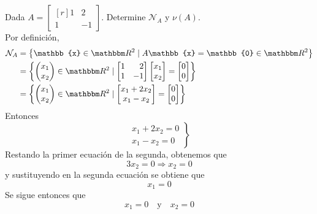 \begin{example}
    Dada $A = \begin{bmatrix*}[r]
        1 & 2 \\
        1 & -1
    \end{bmatrix*}$. Determine $\mathcal{N}_A$ y $\nu(A)$. \\
    \solucion Por definición,
    \begin{align*}
        \mathcal{N}_A & = \left\{ \mathbb{x} \in \RR[2] \mid A\mathbb{x} = \mathbb{0} \in \RR[2] \right\} \\
        & = \left\{ \begin{pmatrix}
            x_1 \\
            x_2
        \end{pmatrix} \in \RR[2] \mid \begin{bmatrix*}[r]
            1 & 2 \\
            1 & -1
        \end{bmatrix*} \begin{bmatrix}
            x_1 \\
            x_2
        \end{bmatrix} = \begin{bmatrix}
            0 \\
            0
        \end{bmatrix} \right\} \\
        & = \left\{ \begin{pmatrix}
            x_1 \\
            x_2
        \end{pmatrix} \in \RR[2] \mid \begin{bmatrix}
            x_1 + 2x_2 \\
            x_1 - x_2
        \end{bmatrix} = \begin{bmatrix}
            0 \\
            0
        \end{bmatrix} \right\}
    \end{align*}
    Entonces
    $$\left. \begin{array}{r}
        x_1 + 2x_2 = 0\\
        x_1 - x_2 = 0
    \end{array} \right\}$$
    Restando la primer ecuación de la segunda, obtenemos que
    $$3x_2 = 0 \Longrightarrow x_2 = 0$$
    y sustituyendo en la segunda ecuación se obtiene que
    $$x_1 = 0$$
    Se sigue entonces que
    $$x_1 = 0 \quad \text{y} \quad x_2 = 0$$

\end{example}
